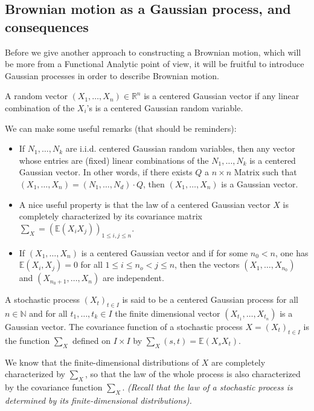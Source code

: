 \documentclass[../mainfile.tex]{subfiles}
\begin{document}
\subsection{Brownian motion as a Gaussian process, and consequences}
Before we give another approach to constructing a Brownian motion, which will be more from a Functional Analytic point of view,  it will be fruitful to introduce Gaussian processes in order to describe Brownian motion. 
\begin{defn} A random vector $(X_1,  \dots , X_n) \in \mathbb{R}^n$ is a centered Gaussian vector if any linear combination of the $X_i$'s is a centered Gaussian random variable. 
\end{defn} 
We can make some useful remarks (that should be reminders):
\begin{itemize}
\item If $N_1, \dots , N_k$ are i.i.d. centered Gaussian random variables, then any vector whose entries are (fixed) linear combinations of the $N_1, \dots , N_k$ is a centered Gaussian vector. In other words, if there exists $Q$ a $n \times n$ Matrix such that $(X_1, \dots , X_n)= (N_1, \dots , N_d) \cdot Q$, then $(X_1, \dots , X_n)$ is a Gaussian vector. 
\item A nice useful property is that the law of a centered Gaussian vector $X$ is completely characterized by its covariance matrix $\sum_X=( \mathbb{E}(X_iX_j))_{1 \leq i,j \leq n}$. 
\item If $(X_1, \dots , X_n)$ is a centered Gaussian vector and if for some $n_0 < n$, one has $\mathbb{E}(X_i,X_j)=0$ for all $1 \leq i \leq n_o < j \leq n$, then the vectors $(X_1, \dots , X_{n_0})$ and $(X_{n_0+1}, \dots , X_n)$ are independent.
\end{itemize}
\begin{defn} A stochastic process $(X_t)_{t \in I}$ is said to be a centered Gaussian process for all $n \in \mathbb{N}$ and for all $t_1, \dots , t_k \in I$ the finite dimensional vector $(X_{t_1}, \dots , X_{t_n})$ is a Gaussian vector. The covariance function of a stochastic process $X=(X_t)_{t \in I}$ is the function $\sum_X$ defined on $I \times I$ by $\sum_X(s,t)= \mathbb{E}(X_sX_t)$. 
\end{defn}
\begin{rem} We know that the finite-dimensional distributions of $X$ are completely characterized by $\sum_X$, so that the law of the whole process is also characterized by the covariance function $\sum_X$. \textit{(Recall that the law of a stochastic process is determined by its finite-dimensional distributions).}
\end{rem}
\end{document}
